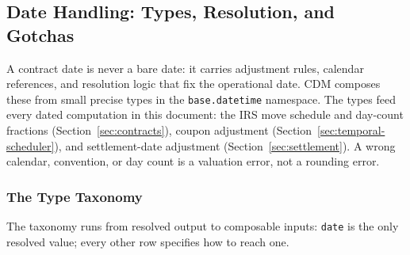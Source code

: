 \subsection{Date Handling: Types, Resolution, and Gotchas}
\label{sec:cdm-dates}

A contract date is never a bare date: it carries adjustment rules, calendar references, and resolution logic that fix the operational date. CDM composes these from small precise types in the \texttt{base.datetime} namespace. The types feed every dated computation in this document: the IRS move schedule and day-count fractions (Section~\ref{sec:contracts}), coupon adjustment (Section~\ref{sec:temporal-scheduler}), and settlement-date adjustment (Section~\ref{sec:settlement}). A wrong calendar, convention, or day count is a valuation error, not a rounding error.

\subsubsection{The Type Taxonomy}
\label{sec:cdm-date-types}

The taxonomy runs from resolved output to composable inputs: \texttt{date} is the only resolved value; every other row specifies how to reach one.

